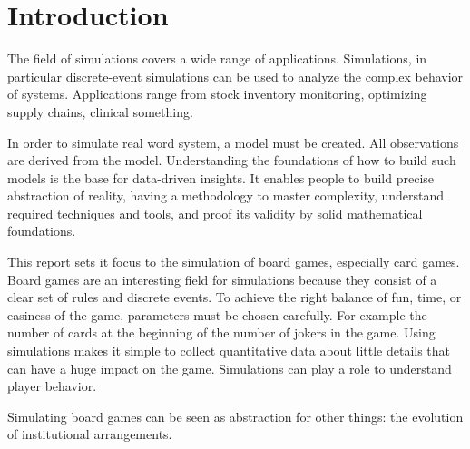 
\section{Introduction}

The field of simulations covers a wide range of applications.
Simulations, in particular discrete-event simulations can be used to analyze the complex behavior of systems. 
Applications range from stock inventory monitoring, optimizing supply chains, clinical something. 

In order to simulate real word system, a model must be created. All observations are derived from the model. Understanding the foundations of how to build such models is the base for data-driven insights. It enables people to build precise abstraction of reality, having a methodology to master complexity, understand required techniques and tools, and proof its validity by solid mathematical foundations. \cite{sokolowski2010modelingintro}

This report sets it focus to the simulation of board games, especially card games. Board games are an interesting field for simulations because they consist of a clear set of rules and discrete events. To achieve the right balance of fun, time, or easiness of the game, parameters must be chosen carefully. For example the number of cards at the beginning of the number of jokers in the game. Using simulations makes it simple to collect quantitative data about little details that can have a huge impact on the game. Simulations can play a role to understand player behavior. 





Simulating board games can be seen as abstraction for other things: 
the evolution of institutional arrangements. \cite{janssen2010evolution}


